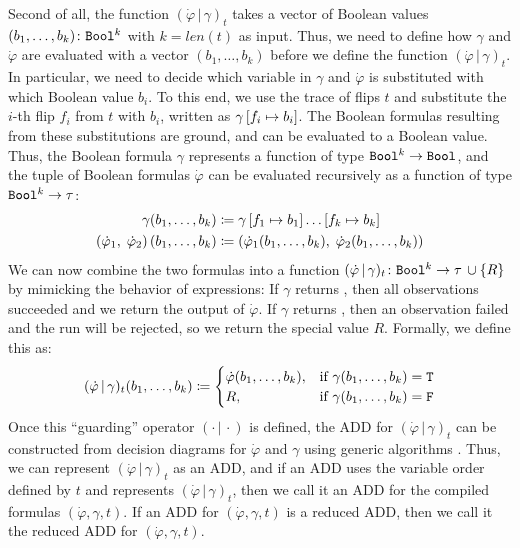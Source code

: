 Second of all, the function $(\dot{\varphi} \,|\, \gamma)_t$ takes a vector of Boolean values $(b_1,\dots,b_k) \colon \texttt{Bool}^k$ with $k=len(t)$ as input.
Thus, we need to define how $\gamma$ and $\dot{\varphi}$ are evaluated with a vector $(b_1,\dots,b_k)$ before we define the function $(\dot{\varphi} \,|\, \gamma)_t$.
In particular, we need to decide which variable in $\gamma$ and $\dot{\varphi}$ is substituted with which Boolean value $b_i$.
To this end, we use the trace of flips $t$ and substitute the $i$-th flip $f_i$ from $t$ with $b_i$, written as $\gamma \left[ {f_i} \mapsto {b_i}\right]$.
The Boolean formulas resulting from these substitutions are ground, and can be evaluated to a Boolean value.
Thus, the Boolean formula $\gamma$ represents a function of type $\texttt{Bool}^k\rightarrow \texttt{Bool}$, and the tuple of Boolean formulas $\dot{\varphi}$ can be evaluated recursively as a function of type $\texttt{Bool}^k\rightarrow \tau$:
%
\begin{align*}
\gamma (b_1,\dots,b_k) &\coloneqq \gamma\left[ {f_1} \mapsto {b_1}\right]\dots\left[ {f_k} \mapsto {b_k}\right]\\
 \left(\dot{\varphi}_1,\; \dot{\varphi}_2\right)(b_1,\dots,b_k) &\coloneqq \left(\dot{\varphi}_1 (b_1,\dots,b_k), \;\dot{\varphi}_2(b_1,\dots,b_k)\right)
\end{align*}
We can now combine the two formulas into a function $(\dot{\varphi} \,|\, \gamma)_t \colon \texttt{Bool}^k\rightarrow \tau\, \cup \{R\}$ by mimicking the behavior of \NDICE expressions:
If $\gamma$ returns \TRUE, then all observations succeeded and we return the output of $\dot{\varphi}$.
If $\gamma$ returns \FALSE, then an observation failed and the run will be rejected, so we return the special value $R$.
Formally, we define this as:
$$ (\dot{\varphi} \,|\, \gamma)_t (b_1,\dots,b_k)\coloneqq \begin{cases}
	\dot{\varphi} (b_1,\dots,b_k), & \text{if } \gamma(b_1,\dots,b_k) = \texttt{T}\\
	R, & \text{if } \gamma(b_1,\dots,b_k) = \texttt{F}
\end{cases}$$%
Once this \enquote{guarding} operator $(\cdot \,|\, \cdot)$ is defined, the ADD for $(\dot{\varphi} \,|\, \gamma)_t$ can be constructed from decision diagrams for $\dot{\varphi}$ and $\gamma$ using generic algorithms \cite{fujita1997multi}.
Thus, we can represent $(\dot{\varphi} \,|\, \gamma)_t$ as an ADD, and if an ADD %
uses the variable order defined by $t$ and represents $(\dot{\varphi} \,|\, \gamma)_t$, then we call it an ADD for the compiled formulas $(\dot{\varphi}, \gamma, t)$.
If an ADD for $(\dot{\varphi}, \gamma, t)$ is a reduced ADD, then we call it the reduced ADD for $(\dot{\varphi}, \gamma, t)$.

